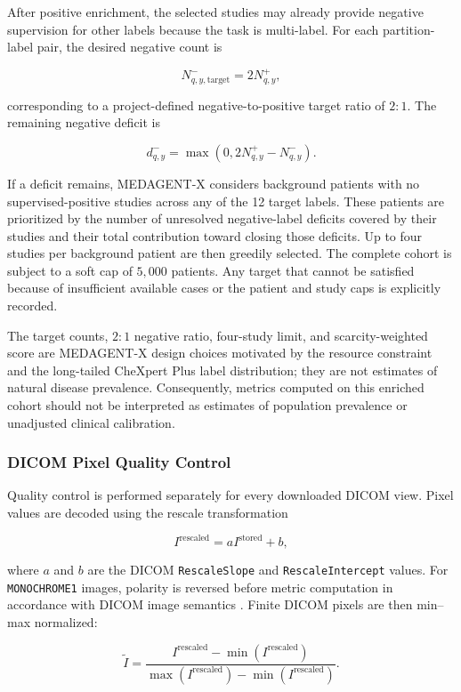 After positive enrichment, the selected studies may already provide negative supervision for other labels because the task is multi-label. For each partition-label pair, the desired negative count is

\[
N^{-}_{q,y,\mathrm{target}}=2N^{+}_{q,y},
\]

corresponding to a project-defined negative-to-positive target ratio of $2{:}1$. The remaining negative deficit is

\[
d^{-}_{q,y}
=
\max\!\left(0,2N^{+}_{q,y}-N^{-}_{q,y}\right).
\]

If a deficit remains, MEDAGENT-X considers background patients with no supervised-positive studies across any of the 12 target labels. These patients are prioritized by the number of unresolved negative-label deficits covered by their studies and their total contribution toward closing those deficits. Up to four studies per background patient are then greedily selected. The complete cohort is subject to a soft cap of $5{,}000$ patients. Any target that cannot be satisfied because of insufficient available cases or the patient and study caps is explicitly recorded.

The target counts, $2{:}1$ negative ratio, four-study limit, and scarcity-weighted score are MEDAGENT-X design choices motivated by the resource constraint and the long-tailed CheXpert Plus label distribution; they are not estimates of natural disease prevalence. Consequently, metrics computed on this enriched cohort should not be interpreted as estimates of population prevalence or unadjusted clinical calibration.

\subsubsection{DICOM Pixel Quality Control}

Quality control is performed separately for every downloaded DICOM view. Pixel values are decoded using the rescale transformation

\[
I^{\mathrm{rescaled}}=aI^{\mathrm{stored}}+b,
\]

where $a$ and $b$ are the DICOM \texttt{RescaleSlope} and \texttt{RescaleIntercept} values. For \texttt{MONOCHROME1} images, polarity is reversed before metric computation in accordance with DICOM image semantics \cite{dicomstandard2026}. Finite DICOM pixels are then min--max normalized:

\[
\widetilde{I}
=
\frac{I^{\mathrm{rescaled}}-\min(I^{\mathrm{rescaled}})}
{\max(I^{\mathrm{rescaled}})-\min(I^{\mathrm{rescaled}})}.
\]

